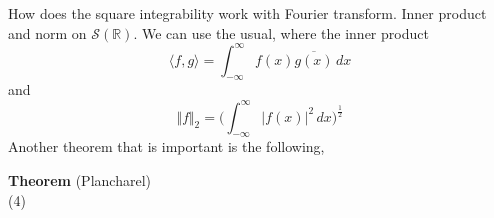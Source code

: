\documentclass[12pt]{article}
\begin{document}
How does the square integrability work with Fourier transform. Inner product and norm on $\mathcal{S}(\mathbb{R})$. 
We can use the usual, where the inner product
$$\langle f, g \rangle = \int^\infty_{-\infty} f(x)\overline{g(x)} \, dx$$
and
$$\Vert f \Vert_2 = \Big(\int^\infty_{-\infty} \vert f(x) \vert^2 \, dx\Big)^{\frac{1}{2}}$$
Another theorem that is important is the following,

\noindent \textbf{Theorem} (Plancharel)\\

(4)
\end{document}

